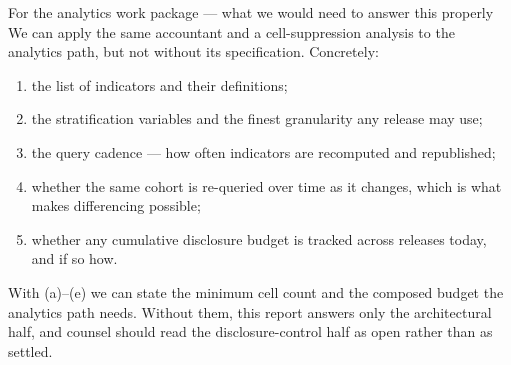 \begin{sidenote}{For the analytics work package --- what we would need to answer this properly}
We can apply the same accountant and a cell-suppression analysis to the analytics path, but not
without its specification. Concretely:
\begin{enumerate}[label=(\alph*)]
  \item the list of indicators and their definitions;
  \item the stratification variables and the finest granularity any release may use;
  \item the query cadence --- how often indicators are recomputed and republished;
  \item whether the same cohort is re-queried over time as it changes, which is what makes
        differencing possible;
  \item whether any cumulative disclosure budget is tracked across releases today, and if so how.
\end{enumerate}
With (a)--(e) we can state the minimum cell count and the composed budget the analytics path needs.
Without them, this report answers only the architectural half, and counsel should read the
disclosure-control half as open rather than as settled.
\end{sidenote}
